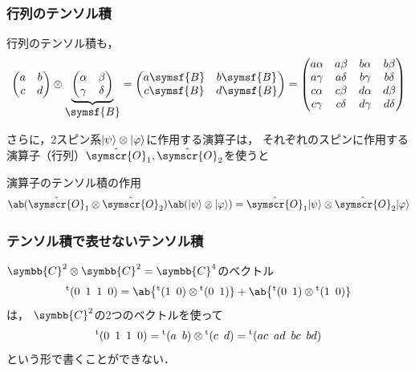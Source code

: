 \documentclass[
    10pt,
    ]{sotsu-beamer}
\begin{document}
\begin{frame}
    \frametitle{行列のテンソル積}

    行列のテンソル積も，
    \begin{equation*}
        \begin{pmatrix}
            a & b \\ c & d
        \end{pmatrix}
        \otimes 
        \underbrace{
        \begin{pmatrix}
            \alpha & \beta \\ \gamma & \delta
        \end{pmatrix}
        }_{\text{\normalsize$\symsf{B}$}}
        = 
        \begin{pmatrix}
            a \symsf{B} & b \symsf{B} \\
            c \symsf{B} & d \symsf{B}
        \end{pmatrix}
        =
        \begin{pmatrix}
            a\alpha & a\beta & b\alpha & b\beta \\
            a\gamma & a\delta & b\gamma & b\delta \\
            c\alpha & c\beta & d\alpha & d\beta \\
            c\gamma & c\delta & d\gamma & d\delta
        \end{pmatrix}
    \end{equation*}

    さらに，2スピン系$\ket{\psi} \otimes \ket{\varphi}$に作用する演算子は，
    それぞれのスピンに作用する演算子（行列）$\hat{\symscr{O}}_1, \hat{\symscr{O}}_2$を使うと
    \begin{alertblock}{演算子のテンソル積の作用}
        \begin{equation*}
            \ab(\hat{\symscr{O}}_1 \otimes \hat{\symscr{O}}_2)
            \ab(\ket{\psi} \otimes \ket{\varphi})
            = \hat{\symscr{O}}_1 \ket{\psi}
              \otimes
              \hat{\symscr{O}}_2 \ket{\varphi}
        \end{equation*}    
    \end{alertblock}

\end{frame}


\begin{frame}
    \frametitle{テンソル積で表せないテンソル積}

    $\symbb{C}^2 \otimes \symbb{C}^2 = \symbb{C}^4$のベクトル
    \begin{equation}
        \label{eq:tensor-product-not-separable}
        \cvector{0 ; 1 ; 1 ; 0}
        = \ab\big\{ \cvector{1 ; 0} \otimes \cvector{0 ; 1} \}
        + \ab\big\{ \cvector{0 ; 1} \otimes \cvector{1 ; 0} \}
    \end{equation}
    は，
    $\symbb{C}^2$の2つのベクトルを使って
    \begin{equation*}
        \cvector{0 ; 1 ; 1 ; 0}
        = \cvector{a ; b} \otimes \cvector{c ; d}
        = \cvector{ac ; ad ; bc ; bd}
    \end{equation*}
    という形で書くことができない．

\end{frame}
\end{document}
